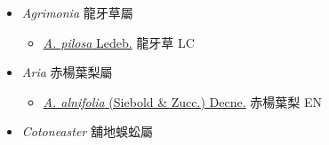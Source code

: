 
  \begin{itemize}
 \item[] \textit{Agrimonia} 龍牙草屬
                                
  \begin{itemize}
        \item[] \href{http://www.theplantlist.org/tpl1.1/search?q=Agrimonia+pilosa}{\textit{A. pilosa} Ledeb.}   龍牙草   LC
  \end{itemize}
 \item[] \textit{Aria} 赤楊葉梨屬
                                
  \begin{itemize}
        \item[] \href{http://www.theplantlist.org/tpl1.1/search?q=Aria+alnifolia}{\textit{A. alnifolia} (Siebold \& Zucc.) Decne.}   赤楊葉梨   EN
  \end{itemize}
 \item[] \textit{Cotoneaster} 舖地蜈蚣屬
                                

\end{itemize}
